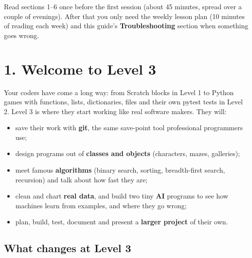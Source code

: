 \documentclass[level=3,teacher]{kidscode}
\begin{document}

\begin{tip}
Read sections 1--6 once before the first session (about 45 minutes, spread over a couple of
evenings). After that you only need the weekly lesson plan (10 minutes of reading each week)
and this guide's \textbf{Troubleshooting} section when something goes wrong.
\end{tip}

\setcounter{tocdepth}{1}
\tableofcontents
\clearpage

\section{1. Welcome to Level 3}

Your coders have come a long way: from Scratch blocks in Level 1 to Python games with
functions, lists, dictionaries, files and their own pytest tests in Level 2. Level 3 is where
they start working like real software makers. They will:

\begin{itemize}[itemsep=2pt]
  \item save their work with \textbf{git}, the same save-point tool professional programmers use;
  \item design programs out of \textbf{classes and objects} (characters, mazes, galleries);
  \item meet famous \textbf{algorithms} (binary search, sorting, breadth-first search, recursion)
        and talk about how fast they are;
  \item clean and chart \textbf{real data}, and build two tiny \textbf{AI} programs to see how
        machines learn from examples, and where they go wrong;
  \item plan, build, test, document and present a \textbf{larger project} of their own.
\end{itemize}

\subsection{What changes at Level 3}
\end{document}
